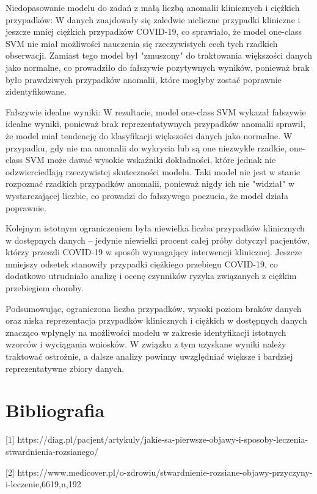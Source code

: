 \documentclass[a4paper,fleqn]{cas-dc}
\begin{document}
Niedopasowanie modelu do zadań z małą liczbą anomalii klinicznych i ciężkich przypadków: W danych znajdowały się zaledwie nieliczne przypadki kliniczne i jeszcze mniej ciężkich przypadków COVID-19, co sprawiało, że model one-class SVM nie miał możliwości nauczenia się rzeczywistych cech tych rzadkich obserwacji. Zamiast tego model był "zmuszony" do traktowania większości danych jako normalne, co prowadziło do fałszywie pozytywnych wyników, ponieważ brak było prawdziwych przypadków anomalii, które mogłyby zostać poprawnie zidentyfikowane.

Fałszywie idealne wyniki: W rezultacie, model one-class SVM wykazał fałszywie idealne wyniki, ponieważ brak reprezentatywnych przypadków anomalii sprawił, że model miał tendencję do klasyfikacji większości danych jako normalne. W przypadku, gdy nie ma anomalii do wykrycia lub są one niezwykle rzadkie, one-class SVM może dawać wysokie wskaźniki dokładności, które jednak nie odzwierciedlają rzeczywistej skuteczności modelu. Taki model nie jest w stanie rozpoznać rzadkich przypadków anomalii, ponieważ nigdy ich nie "widział" w wystarczającej liczbie, co prowadzi do fałszywego poczucia, że model działa poprawnie.


Kolejnym istotnym ograniczeniem była niewielka liczba przypadków klinicznych w dostępnych danych – jedynie niewielki procent całej próby dotyczył pacjentów, którzy przeszli COVID-19 w sposób wymagający interwencji klinicznej. Jeszcze mniejszy odsetek stanowiły przypadki ciężkiego przebiegu COVID-19, co dodatkowo utrudniało analizę i ocenę czynników ryzyka związanych z ciężkim przebiegiem choroby.

Podsumowując, ograniczona liczba przypadków, wysoki poziom braków danych oraz niska reprezentacja przypadków klinicznych i ciężkich w dostępnych danych znacząco wpłynęły na możliwości modelu w zakresie identyfikacji istotnych wzorców i wyciągania wniosków. W związku z tym uzyskane wyniki należy traktować ostrożnie, a dalsze analizy powinny uwzględniać większe i bardziej reprezentatywne zbiory danych.

\section{Bibliografia}

[1] https://diag.pl/pacjent/artykuly/jakie-sa-pierwsze-objawy-i-sposoby-leczenia-stwardnienia-rozsianego/

[2] https://www.medicover.pl/o-zdrowiu/stwardnienie-rozsiane-objawy-przyczyny-i-leczenie,6619,n,192
\end{document}
